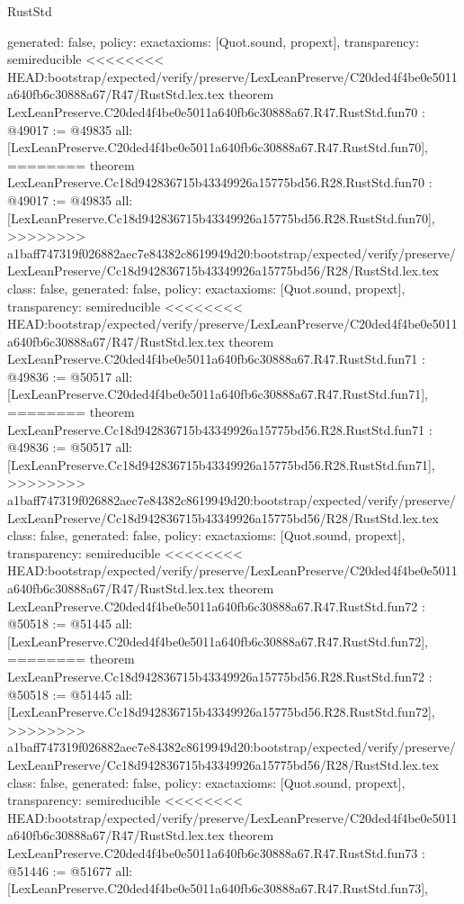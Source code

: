 \begin{lexlean}{RustStd}
\begin{coremodule}
{\begin{coremodule}
{{{{{{{{{{{{{{{{{{{{{{{{{{{{{{{{{{{{{{{{{{{{{{{{{{{{{{{{{{{{{{{{{{{{{{{{{  generated: false,
  policy: exact{axioms: [Quot.sound, propext]},
  transparency: semireducible
}
<<<<<<<< HEAD:bootstrap/expected/verify/preserve/LexLeanPreserve/C20ded4f4be0e5011a640fb6c30888a67/R47/RustStd.lex.tex
theorem LexLeanPreserve.C20ded4f4be0e5011a640fb6c30888a67.R47.RustStd.fun70 : @49017 := @49835 {
  all: [LexLeanPreserve.C20ded4f4be0e5011a640fb6c30888a67.R47.RustStd.fun70],
========
theorem LexLeanPreserve.Cc18d942836715b43349926a15775bd56.R28.RustStd.fun70 : @49017 := @49835 {
  all: [LexLeanPreserve.Cc18d942836715b43349926a15775bd56.R28.RustStd.fun70],
>>>>>>>> a1baff747319f026882aec7e84382c8619949d20:bootstrap/expected/verify/preserve/LexLeanPreserve/Cc18d942836715b43349926a15775bd56/R28/RustStd.lex.tex
  class: false,
  generated: false,
  policy: exact{axioms: [Quot.sound, propext]},
  transparency: semireducible
}
<<<<<<<< HEAD:bootstrap/expected/verify/preserve/LexLeanPreserve/C20ded4f4be0e5011a640fb6c30888a67/R47/RustStd.lex.tex
theorem LexLeanPreserve.C20ded4f4be0e5011a640fb6c30888a67.R47.RustStd.fun71 : @49836 := @50517 {
  all: [LexLeanPreserve.C20ded4f4be0e5011a640fb6c30888a67.R47.RustStd.fun71],
========
theorem LexLeanPreserve.Cc18d942836715b43349926a15775bd56.R28.RustStd.fun71 : @49836 := @50517 {
  all: [LexLeanPreserve.Cc18d942836715b43349926a15775bd56.R28.RustStd.fun71],
>>>>>>>> a1baff747319f026882aec7e84382c8619949d20:bootstrap/expected/verify/preserve/LexLeanPreserve/Cc18d942836715b43349926a15775bd56/R28/RustStd.lex.tex
  class: false,
  generated: false,
  policy: exact{axioms: [Quot.sound, propext]},
  transparency: semireducible
}
<<<<<<<< HEAD:bootstrap/expected/verify/preserve/LexLeanPreserve/C20ded4f4be0e5011a640fb6c30888a67/R47/RustStd.lex.tex
theorem LexLeanPreserve.C20ded4f4be0e5011a640fb6c30888a67.R47.RustStd.fun72 : @50518 := @51445 {
  all: [LexLeanPreserve.C20ded4f4be0e5011a640fb6c30888a67.R47.RustStd.fun72],
========
theorem LexLeanPreserve.Cc18d942836715b43349926a15775bd56.R28.RustStd.fun72 : @50518 := @51445 {
  all: [LexLeanPreserve.Cc18d942836715b43349926a15775bd56.R28.RustStd.fun72],
>>>>>>>> a1baff747319f026882aec7e84382c8619949d20:bootstrap/expected/verify/preserve/LexLeanPreserve/Cc18d942836715b43349926a15775bd56/R28/RustStd.lex.tex
  class: false,
  generated: false,
  policy: exact{axioms: [Quot.sound, propext]},
  transparency: semireducible
}
<<<<<<<< HEAD:bootstrap/expected/verify/preserve/LexLeanPreserve/C20ded4f4be0e5011a640fb6c30888a67/R47/RustStd.lex.tex
theorem LexLeanPreserve.C20ded4f4be0e5011a640fb6c30888a67.R47.RustStd.fun73 : @51446 := @51677 {
  all: [LexLeanPreserve.C20ded4f4be0e5011a640fb6c30888a67.R47.RustStd.fun73],
}}}}}}}}}}}}}}}}}}}}}}}}}}}}}}}}}}}}}}}}}}}}}}}}}}}}}}}}}}}}}}}}}}}}}}}}}}}}
\end{coremodule}}
\end{coremodule}
\end{lexlean}
